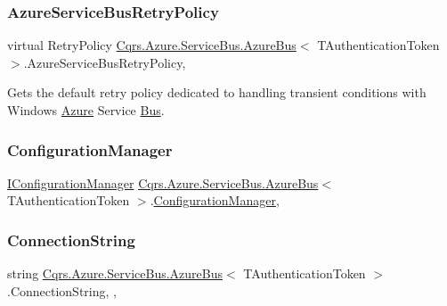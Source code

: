 \subsubsection{\texorpdfstring{Azure\+Service\+Bus\+Retry\+Policy}{AzureServiceBusRetryPolicy}}
{\footnotesize\ttfamily virtual Retry\+Policy \hyperlink{classCqrs_1_1Azure_1_1ServiceBus_1_1AzureBus}{Cqrs.\+Azure.\+Service\+Bus.\+Azure\+Bus}$<$ T\+Authentication\+Token $>$.Azure\+Service\+Bus\+Retry\+Policy\hspace{0.3cm}{\ttfamily [get]}, {\ttfamily [protected]}}



Gets the default retry policy dedicated to handling transient conditions with Windows \hyperlink{namespaceCqrs_1_1Azure}{Azure} Service \hyperlink{namespaceCqrs_1_1Bus}{Bus}. 

\mbox{\label{classCqrs_1_1Azure_1_1ServiceBus_1_1AzureBus_aaf9469d220fb23cb0521fa76b25ab228}} 
\subsubsection{\texorpdfstring{Configuration\+Manager}{ConfigurationManager}}
{\footnotesize\ttfamily \hyperlink{interfaceCqrs_1_1Configuration_1_1IConfigurationManager}{I\+Configuration\+Manager} \hyperlink{classCqrs_1_1Azure_1_1ServiceBus_1_1AzureBus}{Cqrs.\+Azure.\+Service\+Bus.\+Azure\+Bus}$<$ T\+Authentication\+Token $>$.\hyperlink{classCqrs_1_1Configuration_1_1ConfigurationManager}{Configuration\+Manager}\hspace{0.3cm}{\ttfamily [get]}, {\ttfamily [protected]}}

\mbox{\label{classCqrs_1_1Azure_1_1ServiceBus_1_1AzureBus_aaccdbc8cd25d3ae4f1a2801d2ad02a96}} 
\subsubsection{\texorpdfstring{Connection\+String}{ConnectionString}}
{\footnotesize\ttfamily string \hyperlink{classCqrs_1_1Azure_1_1ServiceBus_1_1AzureBus}{Cqrs.\+Azure.\+Service\+Bus.\+Azure\+Bus}$<$ T\+Authentication\+Token $>$.Connection\+String\hspace{0.3cm}{\ttfamily [get]}, {\ttfamily [set]}, {\ttfamily [protected]}}

